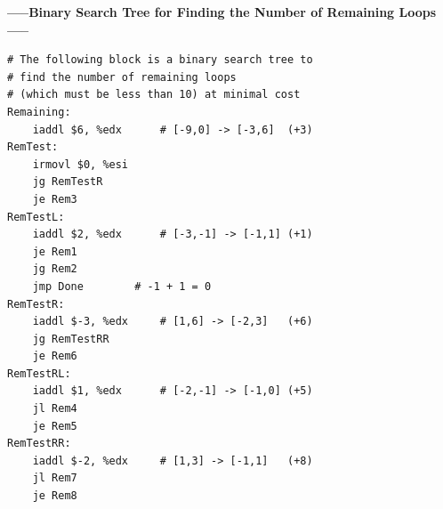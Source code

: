 \documentclass[12pt,a4paper]{article}
\begin{document}
\begin{center}
        \textbf{-----Binary Search Tree for Finding the Number of Remaining Loops-----}\\
\end{center}
\begin{lstlisting}
# The following block is a binary search tree to 
# find the number of remaining loops 
# (which must be less than 10) at minimal cost
Remaining:
	iaddl $6, %edx		# [-9,0] -> [-3,6]	(+3)
RemTest:
	irmovl $0, %esi
	jg RemTestR
	je Rem3
RemTestL:
	iaddl $2, %edx		# [-3,-1] -> [-1,1]	(+1)
	je Rem1
	jg Rem2
	jmp Done		# -1 + 1 = 0
RemTestR:
	iaddl $-3, %edx		# [1,6] -> [-2,3]	(+6)
	jg RemTestRR
	je Rem6
RemTestRL:
	iaddl $1, %edx		# [-2,-1] -> [-1,0]	(+5)
	jl Rem4
	je Rem5
RemTestRR:
	iaddl $-2, %edx		# [1,3] -> [-1,1]	(+8)
	jl Rem7
	je Rem8
\end{lstlisting}
\end{document}
